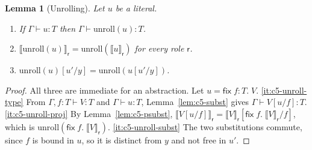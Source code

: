 \documentclass[11pt]{report}
\theoremstyle{plain}
\newtheorem{lemma}[theorem]{Lemma}
\theoremstyle{definition}
\theoremstyle{remark}
\newcommand{\kw}[1]{\mathsf{#1}}
\newcommand{\rr}{\mathsf{r}}
\newcommand{\proj}[2]{\llbracket #1 \rrbracket_{#2}}
\newcommand{\cfix}[3]{\kw{fix}\;#1{:}#2.\;#3}
\newcommand{\nfix}[2]{\kw{fix}\;#1.\;#2}
\newcommand{\unroll}[1]{\mathrm{unroll}(#1)}
\begin{document}
\begin{lemma}[Unrolling]\label{lem:c5-unroll}
  Let $u$ be a literal.
  \begin{enumerate}[label=(\roman*),nosep]
  \item\label{it:c5-unroll-type} If $\Gamma\vdash u:T$ then $\Gamma\vdash\unroll{u}:T$.
  \item\label{it:c5-unroll-proj} $\proj{\unroll{u}}{\rr}=\unroll{\proj{u}{\rr}}$ for every role $\rr$.
  \item\label{it:c5-unroll-subst} $\unroll{u}[u'/y]=\unroll{u[u'/y]}$.
  \end{enumerate}
\end{lemma}
\begin{proof}
  All three are immediate for an abstraction.  Let $u=\cfix{f}{T}{V}$.
  \ref{it:c5-unroll-type} From $\Gamma,f{:}T\vdash V:T$ and
  $\Gamma\vdash u:T$, Lemma~\ref{lem:c5-subst} gives $\Gamma\vdash V[u/f]:T$.
  \ref{it:c5-unroll-proj} By Lemma~\ref{lem:c5-psubst},
  $\proj{V[u/f]}{\rr}=\proj{V}{\rr}[\nfix{f}{\proj{V}{\rr}}/f]$, which is
  $\unroll{\nfix{f}{\proj{V}{\rr}}}$.
  \ref{it:c5-unroll-subst} The two substitutions commute, since $f$ is bound
  in $u$, so it is distinct from $y$ and not free in $u'$.
\end{proof}
\end{document}
